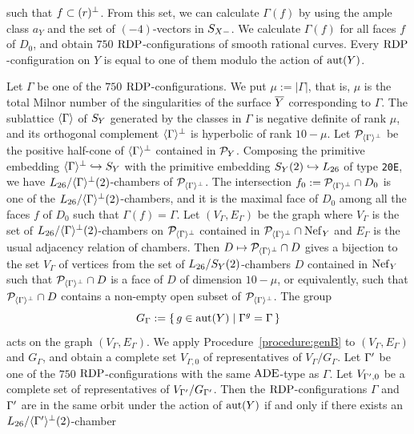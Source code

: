 \documentclass{amsart}
\numberwithin{procedure}{section}
\begin{document}
such that $f\subset(r)\sp{\perp}$.
From this set, we can calculate $\Gamma(f)$ by 
using the ample class $a_Y$ and
the set of $(-4)$-vectors in
$S_{X-}$.
We calculate $\Gamma(f)$ for all faces  $f$ of $D_0$,
and obtain $750$ $\mathord{\rm RDP}$-configurations of smooth rational curves.
Every $\mathord{\rm RDP}$-configuration on $Y$ is equal to one of them
modulo the action of $\mathord{\rm{aut}}(Y)$.
%
\par
Let $\Gamma$ be one of the $750$ $\mathord{\rm RDP}$-configurations.
We put $\mu:=|\Gamma|$, that is, $\mu$ is 
the total Milnor number 
of the singularities of the surface $\overline{Y}$ corresponding to $\Gamma$.
The sublattice $\langle {\Gamma} \rangle$ of $S_{Y}$
generated by the classes in $\Gamma$ is negative definite of rank $\mu$,
and  its orthogonal complement $\langle {\Gamma} \rangle\sp{\perp}$ is
hyperbolic of rank $10-\mu$.
Let $\mathord{\mathcal P}_{\langle {\Gamma} \rangle\sp{\perp}}$ be the positive half-cone
of $\langle {\Gamma} \rangle\sp{\perp}$ contained in $\mathord{\mathcal P}_Y$.
Composing the primitive embedding $\langle {\Gamma} \rangle\sp{\perp}\hookrightarrow S_{Y}$
with the primitive embedding $S_{Y}(2)\hookrightarrow L_{26}$ of type {\tt 20E},
we have $L_{26}/\langle {\Gamma} \rangle\sp{\perp}(2)$-chambers
of  $\mathord{\mathcal P}_{\langle {\Gamma} \rangle\sp{\perp}}$.
The intersection $f_0:=\mathord{\mathcal P}_{\langle {\Gamma} \rangle\sp{\perp}}\cap D_0$
is one of the $L_{26}/\langle {\Gamma} \rangle\sp{\perp}(2)$-chambers,
and it is the maximal face of $D_0$ among all 
the faces $f$ of $D_0$ such that $\Gamma(f)=\Gamma$.
Let $(V_{\Gamma}, E_{\Gamma})$ be the graph where
$V_{\Gamma}$ is the set of $L_{26}/\langle {\Gamma} \rangle\sp{\perp}(2)$-chambers
on $\mathord{\mathcal P}_{\langle {\Gamma} \rangle\sp{\perp}}$
contained in $\mathord{\mathcal P}_{\langle {\Gamma} \rangle\sp{\perp}}\cap \mathord{\rm Nef}_{Y}$
and $E_{\Gamma}$ is the usual adjacency relation of chambers.
Then $D\mapsto \mathord{\mathcal P}_{\langle {\Gamma} \rangle\sp{\perp}}\cap D$
gives a bijection to the set $V_{\Gamma}$ of vertices
from the set of $L_{26}/S_Y(2)$-chambers  $D$ contained in $\mathord{\rm Nef}_{Y}$
such that $\mathord{\mathcal P}_{\langle {\Gamma} \rangle\sp{\perp}}\cap D$
is a face of $D$ of dimension $10-\mu$,
or equivalently, such that 
$\mathord{\mathcal P}_{\langle {\Gamma} \rangle\sp{\perp}}\cap D$ contains 
a non-empty open subset of $\mathord{\mathcal P}_{\langle {\Gamma} \rangle\sp{\perp}}$.
The group
\[
G_{\Gamma}:=\{\,{g\in \mathord{\rm{aut}}(Y)}\mid {\Gamma^g=\Gamma} \,\}
\]
acts on the graph $(V_{\Gamma}, E_{\Gamma})$.
We apply Procedure~\ref{procedure:genB} to
$(V_{\Gamma}, E_{\Gamma})$ and $G_{\Gamma}$,
and obtain
a complete  set $V_{\Gamma, 0}$ of representatives of $V_{\Gamma}/G_{\Gamma}$.
Let $\Gamma\sp\prime$ be one of the $750$ $\mathord{\rm RDP}$-configurations
with the same $\mathord{\rm ADE}$-type as $\Gamma$.
Let $V_{\Gamma\sp\prime, 0}$ be a complete set of
representatives of $V_{\Gamma\sp\prime}/G_{\Gamma\sp\prime}$.
Then the $\mathord{\rm RDP}$-configurations $\Gamma$ and $\Gamma\sp\prime$
are in the same orbit under the action of $\mathord{\rm{aut}}(Y)$
if and only if
there exists  an $L_{26}/\langle {\Gamma\sp\prime} \rangle\sp{\perp}(2)$-chamber
\end{document}
